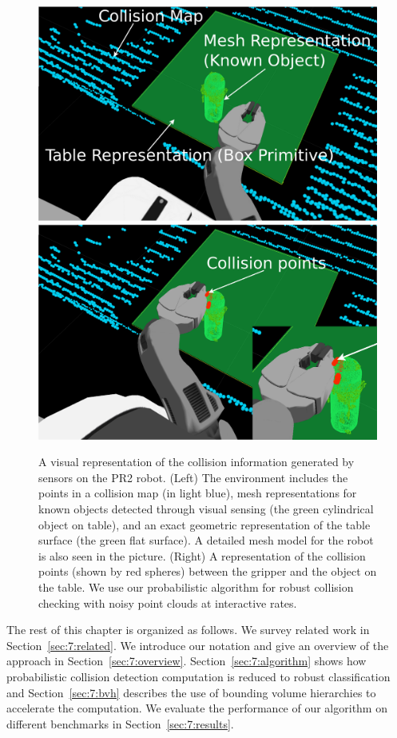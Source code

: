 \begin{figure}[htb]
  \centering
  \includegraphics[width=0.45\linewidth]{figs/7/labeled_small.png}
  \includegraphics[width=0.45\linewidth]{figs/7/labeled_in_collision_pip.png}
  \caption[A visual representation of the collision information generated by the sensors on the PR2 robot]{\label{fig:7:pr2} A visual representation of the collision information generated by sensors on the PR2 robot. (Left) The environment includes the points in a collision map (in light blue), mesh representations for known objects detected through visual sensing (the green cylindrical object on table), and an exact geometric representation of the table surface (the green flat surface). A detailed mesh model for the robot is also seen in the picture. (Right) A representation of the collision points (shown by red spheres) between the gripper and the object on the table.
We use our probabilistic algorithm for robust collision checking with noisy point clouds at interactive rates.}
\end{figure}

The rest of this chapter is organized as follows. We survey related work in Section~\ref{sec:7:related}.  We introduce our notation and give an overview of the approach in
Section~\ref{sec:7:overview}.
Section~\ref{sec:7:algorithm} shows how probabilistic collision detection computation is reduced to robust classification and Section~\ref{sec:7:bvh} describes the use of bounding volume hierarchies to accelerate the
computation.
We evaluate the performance of our algorithm on different benchmarks in Section~\ref{sec:7:results}.


